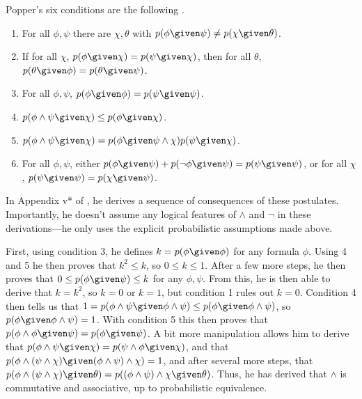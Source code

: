 Popper's six conditions are the following \citep[Appendix iv*]{popperlosd}.
\begin{enumerate}
\item For all $\phi,\psi$ there are $\chi,\theta$ with $p(\phi \given \psi)\neq p(\chi \given \theta)$.
\item If for all $\chi$, $p(\phi \given \chi)=p(\psi \given \chi)$, then for all $\theta$, $p(\theta \given \phi)=p(\theta \given \psi)$.
\item For all $\phi,\psi$, $p(\phi \given \phi)=p(\psi \given \psi)$.
\item $p(\phi\land \psi \given \chi)\leq p(\phi \given \chi)$.
\item $p(\phi\land \psi \given \chi)=p(\phi \given \psi\land \chi)p(\psi \given \chi)$.
\item For all $\phi,\psi$, either $p(\phi \given \psi)+p(\lnot \phi \given \psi)=p(\psi \given \psi)$, or for all $\chi$, ${p(\psi \given \psi)=p(\chi \given \psi)}$.
\end{enumerate}

In Appendix v* of \citet{popperlosd}, he derives a sequence of consequences of these postulates. Importantly, he doesn't assume any logical features of $\land$ and $\lnot$ in these derivations---he only uses the explicit probabilistic assumptions made above. 

First, using condition 3, he defines $k=p(\phi \given \phi)$ for any formula $\phi$. Using 4 and 5 he then proves that $k^2\leq k$, so $0\leq k\leq 1$. After a few more steps, he then proves that $0\leq p(\phi \given \psi)\leq k$ for any $\phi,\psi$. From this, he is then able to derive that $k=k^2$, so $k=0$ or $k=1$, but condition 1 rules out $k=0$. Condition 4 then tells us that $1=p(\phi\land \psi \given \phi\land \psi)\leq p(\phi \given \phi\land \psi)$, so $p(\phi \given \phi\land \psi)=1$. With condition 5 this then proves that $p(\phi\land \phi \given \psi)=p(\phi \given \psi)$. A bit more manipulation allows him to derive that $p(\phi\land \psi \given \chi)=p(\psi\land \phi \given \chi)$, and that $p(\phi\land(\psi\land \chi) \given (\phi\land \psi)\land \chi)=1$, and after several more steps, that $p(\phi\land(\psi\land \chi) \given \theta)=p((\phi\land \psi)\land \chi \given \theta)$. Thus, he has derived that $\land$ is commutative and associative, up to probabilistic equivalence.

